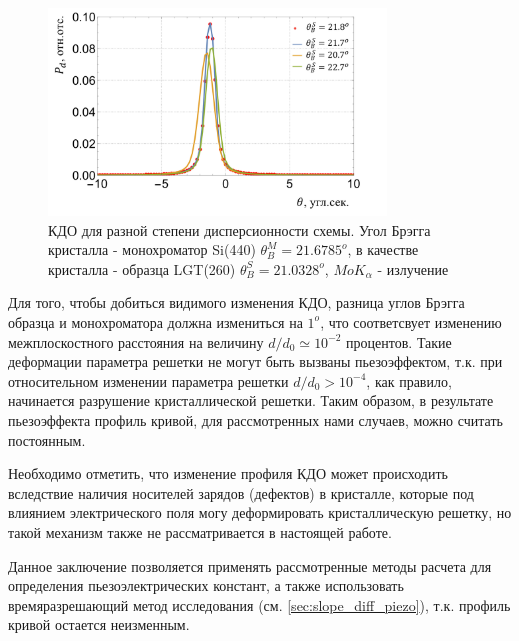 \begin{figure}[H]
  \centering
  \includegraphics[width=0.8\textwidth]{images/FWHM_diference_bragg_KDO.png}
  \caption{КДО для разной степени дисперсионности схемы. Угол Брэгга кристалла - монохроматор
  Si(440) $\theta_B^M = 21.6785 ^o$, в качестве кристалла - образца LGT(260) $\theta_B^S = 21.0328 ^o$, $MoK_{\alpha}$ - излучение
  }
  \label{ris:FWHM_diference_bragg_KDO}
\end{figure}

Для того, чтобы добиться видимого изменения КДО, разница углов Брэгга образца и монохроматора
должна измениться на $1^o$, что соответсвует изменению межплоскостного расстояния на величину $d/d_0 \simeq 10^{-2}$
процентов. Такие деформации параметра решетки не могут быть вызваны пьезоэффектом,
т.к. при относительном изменении параметра решетки $d/d_0 > 10^{-4}$, как правило,
начинается разрушение кристаллической решетки. Таким образом, в результате пьезоэффекта профиль кривой,
для рассмотренных нами случаев, можно считать постоянным.

Необходимо отметить, что изменение профиля КДО может происходить вследствие наличия
носителей зарядов (дефектов) в кристалле, которые под влиянием электрического поля
 могу деформировать кристаллическую решетку, но такой механизм
также не рассматривается в настоящей работе.

Данное заключение позволяется применять рассмотренные методы расчета для определения пьезоэлектрических констант,
а также использовать времяразрешающий метод исследования (см. \ref{sec:slope_diff_piezo}),
т.к. профиль кривой остается неизменным.
